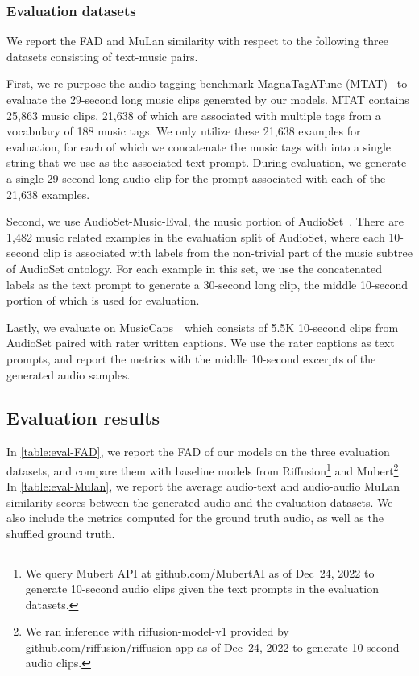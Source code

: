 \documentclass[nohyperref]{article}
\newcommand{\EvalSet}{MusicCaps~\cite{musiclm2023}}
\theoremstyle{plain}
\theoremstyle{definition}
\theoremstyle{remark}
\begin{document}
\subsubsection{Evaluation datasets}

We report the FAD and MuLan similarity with respect to the following three datasets consisting of text-music pairs.

First, we re-purpose the audio tagging benchmark MagnaTagATune (MTAT)~\cite{law2009evaluation} to evaluate the 29-second long music clips generated by our models.
MTAT contains 25,863 music clips, 21,638 of which are associated with multiple tags from a vocabulary of 188 music tags. We only utilize these 21,638 examples for evaluation, for each of which we concatenate the music tags with into a single string that we use as the associated text prompt. During evaluation, we generate a single 29-second long audio clip for the prompt associated with each of the 21,638 examples.

Second, we use AudioSet-Music-Eval, the music portion of AudioSet~\cite{gemmeke2017audio}. There are 1,482 music related examples in the evaluation split of AudioSet, where each 10-second clip is associated with labels from the non-trivial part of the music subtree of AudioSet ontology. For each example in this set, we use the concatenated labels as the text prompt to generate a 30-second long clip, the middle 10-second portion of which is used for evaluation. 

Lastly, we evaluate on \EvalSet~which consists of 5.5K 10-second clips from AudioSet paired with rater written captions. We use the rater captions as text prompts, and report the metrics with the middle 10-second excerpts of the generated audio samples.

\subsection{Evaluation results}
In \cref{table:eval-FAD}, we report the FAD of our models on the three evaluation datasets, and compare them with baseline models from Riffusion\footnote{We query Mubert API at \href{https://github.com/MubertAI}{github.com/MubertAI} as of Dec~24, 2022 to generate 10-second audio clips given the text prompts in the evaluation datasets.} and Mubert\footnote{We ran inference with riffusion-model-v1 provided by \href{https://github.com/riffusion/riffusion-app}{github.com/riffusion/riffusion-app} as of Dec~24, 2022 to generate 10-second audio clips.}. 
In \cref{table:eval-Mulan}, we report the average audio-text and audio-audio MuLan similarity scores between the generated audio and the evaluation datasets. We also include the metrics computed for the ground truth audio, as well as the shuffled ground truth.
\end{document}
